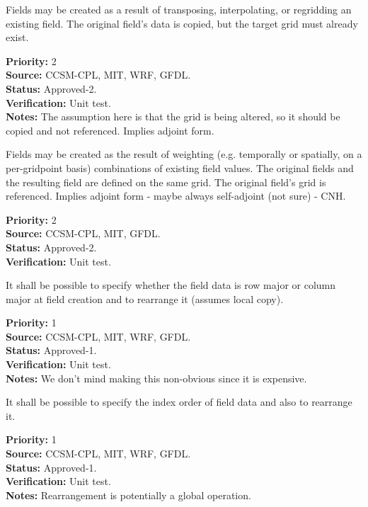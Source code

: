 Fields may be created as a result of transposing, interpolating, or regridding
an existing field.  The original field's data is copied, but the target grid
must already exist.
\begin{reqlist} 
{\bf Priority:} 2 \\
{\bf Source:} CCSM-CPL, MIT, WRF, GFDL. \\
{\bf Status:} Approved-2. \\
{\bf Verification:} Unit test. \\
{\bf Notes:} The assumption here is that the grid is being altered, so it
should be copied and not referenced. Implies adjoint form.
\end{reqlist}

Fields may be created as the result of weighting (e.g. temporally or spatially, on
a per-gridpoint basis)
combinations of existing field values.  The original fields and the resulting
field are defined on the same grid.  The original field's grid is referenced.
Implies adjoint form - maybe always self-adjoint (not sure) - CNH.
\begin{reqlist} 
{\bf Priority:} 2 \\
{\bf Source:} CCSM-CPL, MIT, GFDL. \\
{\bf Status:} Approved-2. \\
{\bf Verification:} Unit test. 
\end{reqlist}

It shall be possible to specify whether the field data is row major or column major 
at field creation and to rearrange it (assumes local copy).  
\begin{reqlist}
{\bf Priority:} 1 \\
{\bf Source:} CCSM-CPL, MIT, WRF, GFDL. \\
{\bf Status:} Approved-1. \\
{\bf Verification:} Unit test. \\
{\bf Notes:} We don't mind making this non-obvious since it is expensive.
\end{reqlist}

It shall be possible to specify the index order of field data 
and also to rearrange it. 
\begin{reqlist}
{\bf Priority:} 1 \\
{\bf Source:} CCSM-CPL, MIT, WRF, GFDL. \\
{\bf Status:} Approved-1. \\
{\bf Verification:} Unit test. \\
{\bf Notes:} Rearrangement is potentially a global operation.
\end{reqlist}

